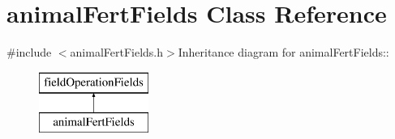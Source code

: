 \hypertarget{classanimal_fert_fields}{
\section{animalFertFields Class Reference}
\label{classanimal_fert_fields}
}


{\ttfamily \#include $<$animalFertFields.h$>$}Inheritance diagram for animalFertFields::\begin{figure}[H]
\begin{center}
\leavevmode
\includegraphics[height=2cm]{classanimal_fert_fields}
\end{center}
\end{figure}
